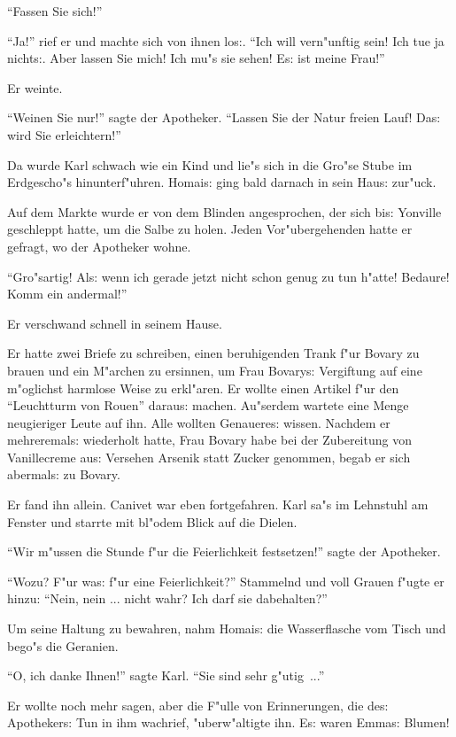 \documentclass[oneside,12pt]{book}
\newcommand{\s}{s:}%
\begin{document}
"`Fassen Sie sich!"'

"`Ja!"' rief er und machte sich von ihnen lo{\s}. "`Ich will
vern"unftig sein! Ich tue ja nicht{\s}. Aber lassen Sie mich! Ich
mu"s sie sehen! E{\s} ist meine Frau!"'

Er weinte.

"`Weinen Sie nur!"' sagte der Apotheker. "`Lassen Sie der Natur
freien Lauf! Da{\s} wird Sie erleichtern!"'

Da wurde Karl schwach wie ein Kind und lie"s sich in die Gro"se
Stube im Erdgescho"s hinunterf"uhren. Homai{\s} ging bald darnach
in sein Hau{\s} zur"uck.

Auf dem Markte wurde er von dem Blinden angesprochen, der sich
bi{\s} Yonville geschleppt hatte, um die Salbe zu holen. Jeden
Vor"ubergehenden hatte er gefragt, wo der Apotheker wohne.

"`Gro"sartig! Al{\s} wenn ich gerade jetzt nicht schon genug zu
tun h"atte! Bedaure! Komm ein andermal!"'

Er verschwand schnell in seinem Hause.

Er hatte zwei Briefe zu schreiben, einen beruhigenden Trank f"ur
Bovary zu brauen und ein M"archen zu ersinnen, um Frau Bovary{\s}
Vergiftung auf eine m"oglichst harmlose Weise zu erkl"aren. Er
wollte einen Artikel f"ur den "`Leuchtturm von Rouen"' darau{\s}
machen. Au"serdem wartete eine Menge neugieriger Leute auf ihn.
Alle wollten Genauere{\s} wissen. Nachdem er mehreremal{\s}
wiederholt hatte, Frau Bovary habe bei der Zubereitung von
Vanillecreme au{\s} Versehen Arsenik statt Zucker genommen, begab
er sich abermal{\s} zu Bovary.

Er fand ihn allein. Canivet war eben fortgefahren. Karl sa"s im
Lehnstuhl am Fenster und starrte mit bl"odem Blick auf die Dielen.

"`Wir m"ussen die Stunde f"ur die Feierlichkeit festsetzen!"'
sagte der Apotheker.

"`Wozu? F"ur wa{\s} f"ur eine Feierlichkeit?"' Stammelnd und voll
Grauen f"ugte er hinzu: "`Nein, nein ... nicht wahr? Ich darf sie
dabehalten?"'

Um seine Haltung zu bewahren, nahm Homai{\s} die Wasserflasche vom
Tisch und bego"s die Geranien.

"`O, ich danke Ihnen!"' sagte Karl. "`Sie sind sehr g"utig~..."'

Er wollte noch mehr sagen, aber die F"ulle von Erinnerungen, die
de{\s} Apotheker{\s} Tun in ihm wachrief, "uberw"altigte ihn.
E{\s} waren Emma{\s} Blumen!
\end{document}
